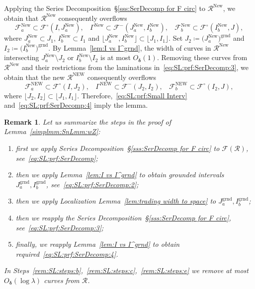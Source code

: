 \documentclass{amsart}
\renewcommand{\sp}{{\ \ }}
\newcommand{\1}{{\mathbb 1 }}
\newcommand{\Fam}{{\mathcal F}}
\newcommand\RR{\mathcal{R}}
\newcommand{\grnd}{{\operatorname{grnd}}}
\newcommand\New{{\operatorname{New}}}
\newcommand\NEW{{\operatorname{NEW}}}
\newtheorem{rem}[thm]{Remark}
\theoremstyle{remark}
\numberwithin{equation}{section}
\theoremstyle{definition}
\newcommand{\bdelta}{{\boldsymbol{ \delta}}}
\begin{document}
Applying the Series Decomposition~\S\ref{sss:SerDecomp for F circ}  
to $\RR^\New$, we obtain that $\RR^\New$ consequently overflows 
 \begin{equation}
 \label{eq:SL:prf:SerDecomp:3}
\Fam^\New_a\subset \Fam^\circ (I,J^\New_a),\sp \sp \Gamma^\New\subset \Fam^-(J^\New_a,I^\New_b),\sp \sp \Fam^\New_b\subset \Fam^\circ (I^\New_b, J),
\end{equation}
where $J^\New_a\subset J_1$, $I^\New_b\subset I_1$ and $\lfloor J_a^\New, I^\New_b\rfloor\subset \lfloor J_1, I_1\rfloor$. Set $J_2\coloneqq \big(J^\New_a\big)^\grnd$ and $I_2\coloneqq \big(I^\New_b\big)^\grnd$. By Lemma~\ref{lem:I vs I^grnd}, the width of curves in $\RR^\New$ intersecting $J^\New_a\setminus J_2$ or $I^\New_b\setminus I_2$ is at most $O_\bdelta(1)$. Removing these curves from $\RR^\New$ and their restrictions from the laminations in~\eqref{eq:SL:prf:SerDecomp:3}, we obtain that the new $\RR^\NEW$ consequently overflows
\begin{equation}
 \label{eq:SL:prf:SerDecomp:4}
\Fam^\NEW_a\subset \Fam^\circ (I,J_2),\sp \sp \Gamma^\NEW\subset \Fam^-(J_2,I_2),\sp \sp \Fam^\NEW_b\subset \Fam^\circ (I_2, J),
\end{equation}
where $\lfloor J_2,I_2\rfloor \subset \lfloor J_1, I_1\rfloor.$ Therefore,~\eqref{eq:SL:prf:Small Interv} and~\eqref{eq:SL:prf:SerDecomp:4} imply the lemma.




\begin{rem}
\label{rem:SL:steps}
Let us summarize the steps in the proof of Lemma~\ref{simplmm:SnLmm:wZ}: 
\begin{enumerate}[label=\text{(\alph*)},font=\normalfont,leftmargin=*]
\item\label{rem:SL:steps:a} first we apply Series Decomposition~\S\ref{sss:SerDecomp for F circ} to $\Fam(\RR)$, see~\eqref{eq:SL:prf:SerDecomp};
\item\label{rem:SL:steps:b} then we apply Lemma~\ref{lem:I vs I^grnd} to obtain grounded intervals $J_a^\grnd, I_b^\grnd$, see~\eqref{eq:SL:prf:SerDecomp:2};
\item\label{rem:SL:steps:c} then we apply  Localization Lemma~\ref{lem:trading  width to space} to $J_a^\grnd, I_b^\grnd$;
\item\label{rem:SL:steps:d} then we reapply the Series Decomposition~\S\ref{sss:SerDecomp for F circ}, see~\eqref{eq:SL:prf:SerDecomp:3}; 
\item \label{rem:SL:steps:e}finally,  we reapply Lemma~\ref{lem:I vs I^grnd} to obtain required~\eqref{eq:SL:prf:SerDecomp:4}. 
\end{enumerate}
In Steps~\ref{rem:SL:steps:b},~\ref{rem:SL:steps:c},~\ref{rem:SL:steps:e} we remove at most $O_\bdelta(\log \lambda)$ curves from $\RR$.
\end{rem}
\end{document}
